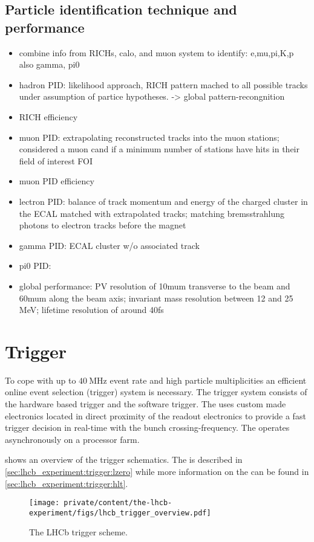 \subsection{Particle identification technique and performance}
\begin{itemize}
  \item combine info from RICHs, calo, and muon system to identify: e,mu,pi,K,p also gamma, pi0
  \item hadron PID: likelihood approach, RICH pattern mached to all possible tracks under assumption of partice hypotheses. -> global pattern-recongnition
  \item RICH efficiency
  \item muon PID: extrapolating reconstructed tracks into the muon stations; considered a muon cand if a minimum number of stations have hits in their field of interest FOI
  \item muon PID efficiency
  \item lectron PID: balance of track momentum and energy of the charged cluster in the ECAL matched with extrapolated tracks; matching bremsstrahlung photons to electron tracks before the magnet
  \item gamma PID: ECAL cluster w/o associated track
  \item pi0 PID: 
  \item global performance: PV resolution of 10mum transverse to the beam and 60mum along the beam axis; invariant mass resolution between 12 and 25 MeV; lifetime resolution of around 40fs
\end{itemize}

\section{Trigger}
\label{sec:lhcb_experiment:trigger}

To cope with up to $\SI{40}{\mega\hertz}$ event rate and high particle
multiplicities an efficient online event selection (trigger) system is
necessary. The \LHCb trigger system consists of the hardware based \LZero
trigger and the \HLT software trigger. The \LZero uses custom made electronics
located in direct proximity of the readout electronics to provide a fast trigger
decision in real-time with the bunch crossing-frequency. The \HLT operates
asynchronously on a processor farm.

 shows an overview of the \LHCb
trigger schematics. The \LZero is described in
\cref{sec:lhcb_experiment:trigger:lzero} while more information on the \HLT can
be found in \cref{sec:lhcb_experiment:trigger:hlt}.
%
\begin{figure}[t]
  \centering
  \texttt{[image: private/content/the-lhcb-experiment/figs/lhcb\_trigger\_overview.pdf]}
  \caption{
    The \acs{LHCb} trigger scheme.
  }
  \label{fig:lhcb_experiment:trigger:overview}
\end{figure}

